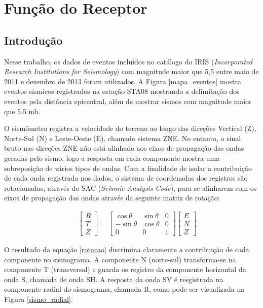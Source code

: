 \chapter{Função do Receptor}

\section{Introdução}

Nesse trabalho, os dados de eventos incluídos no catálogo do IRIS (\textit{Incorporated Research Institutions for Seismology}) com magnitude maior que 5,5 entre maio de 2011 e dezembro de 2013 foram utilizados. A Figura \ref{mapa_eventos} mostra eventos sísmicos registrados na estação STA08 mostrando a delimitação dos eventos pela distância epicentral, além de mostrar sismos com magnitude maior que 5.5 mb.

O sismômetro registra a velocidade do terreno ao longo das direções Vertical (Z), Norte-Sul (N) e Leste-Oeste (E), chamado sistema ZNE. No entanto, o sinal bruto nas direções ZNE não está alinhado aos eixos de propagação das ondas geradas pelo sismo, logo a resposta em cada componente mostra uma sobreposição de vários tipos de ondas. Com a finalidade de isolar a contribuição de cada onda registrada nos dados, o sistema de coordenadas dos registros são rotacionadas, através do SAC (\textit{Seismic Analysis Code}), para se alinharem com os eixos de propagação das ondas através da seguinte matriz de rotação:

\begin{eqnarray}
 & & \left[ \begin{array}{c} R \\ T \\ Z \end{array} \right] = \begin{bmatrix} \cos \theta & \sin \theta & 0 \\ - \sin \theta & \cos \theta & 0 \\ 0 & 0 & 1 \end{bmatrix} \left[ \begin{array}{c} E \\ N \\ Z \end{array} \right]
\label{rotacao}
\end{eqnarray}

O resultado da equação \ref{rotacao} discrimina claramente a contribuição de cada componente  no sismograma. A componente N (norte-sul) transforma-se na componente T (transversal) e guarda os registro da componente horizontal da onda S, chamada de onda SH. A resposta da onda SV é resgistrada na componente radial do sismograma, chamada R, como pode ser visualizada na Figura \ref{sismo_radial}.

